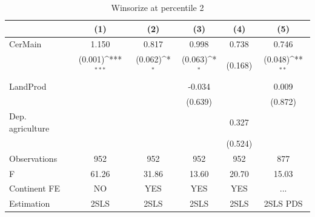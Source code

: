 \documentclass[12pt,a4paper]{article}
\begin{document}
\begin{table}[htbp]\centering
\def\sym#1{\ifmmode^{#1}\else\(^{#1}\)\fi}
\caption{Winsorize at percentile 2}
\begin{tabular}{l*{5}{c}}
\hline\hline
                &\multicolumn{1}{c}{(1)}         &\multicolumn{1}{c}{(2)}         &\multicolumn{1}{c}{(3)}         &\multicolumn{1}{c}{(4)}         &\multicolumn{1}{c}{(5)}         \\
\hline
CerMain         &    1.150         &    0.817         &    0.998         &    0.738         &    0.746         \\
                &  (0.001)\sym{***}&  (0.062)\sym{*}  &  (0.063)\sym{*}  &  (0.168)         &  (0.048)\sym{**} \\
LandProd        &                  &                  &   -0.034         &                  &    0.009         \\
                &                  &                  &  (0.639)         &                  &  (0.872)         \\
Dep. agriculture&                  &                  &                  &    0.327         &                  \\
                &                  &                  &                  &  (0.524)         &                  \\
\hline
Observations    &      952         &      952         &      952         &      952         &      877         \\
F               &    61.26         &    31.86         &    13.60         &    20.70         &    15.03         \\
Continent FE    &       NO         &      YES         &      YES         &      YES         &      ...         \\
Estimation      &     2SLS         &     2SLS         &     2SLS         &     2SLS         & 2SLS PDS         \\
\hline\hline
\end{tabular}
\end{table}
\end{document}
